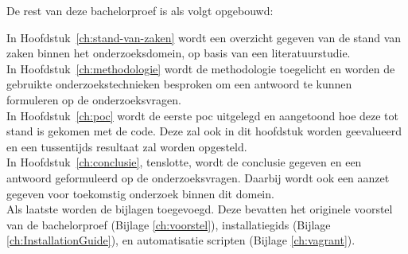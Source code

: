
De rest van deze bachelorproef is als volgt opgebouwd:

In Hoofdstuk~\ref{ch:stand-van-zaken} wordt een overzicht gegeven van de stand van zaken binnen het onderzoeksdomein, op basis van een literatuurstudie.\\

In Hoofdstuk~\ref{ch:methodologie} wordt de methodologie toegelicht en worden de gebruikte onderzoekstechnieken besproken om een antwoord te kunnen formuleren op de onderzoeksvragen.\\

In Hoofdstuk~\ref{ch:poc} wordt de eerste \gls{poc} uitgelegd en aangetoond hoe deze tot stand is gekomen met de code. Deze zal ook in dit hoofdstuk worden geevalueerd en een tussentijds resultaat zal worden opgesteld.\\

In Hoofdstuk~\ref{ch:conclusie}, tenslotte, wordt de conclusie gegeven en een antwoord geformuleerd op de onderzoeksvragen. Daarbij wordt ook een aanzet gegeven voor toekomstig onderzoek binnen dit domein.\\

Als laatste worden de bijlagen toegevoegd. Deze bevatten het originele voorstel van de bachelorproef (Bijlage \ref{ch:voorstel}), installatiegids (Bijlage \ref{ch:InstallationGuide}), en automatisatie scripten (Bijlage \ref{ch:vagrant}).